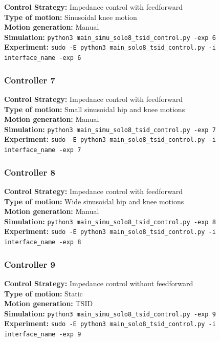 \documentclass[12pt,a4paper]{article}
\begin{document}
\textbf{Control Strategy:} Impedance control with feedforward \\
\textbf{Type of motion:} Sinusoidal knee motion \\
\textbf{Motion generation:} Manual \\
\textbf{Simulation:} \texttt{python3 main\_simu\_solo8\_tsid\_control.py -exp 6} \\
\textbf{Experiment:} \texttt{sudo -E python3 main\_solo8\_tsid\_control.py -i interface\_name -exp 6} \\

\subsubsection{Controller 7}

\textbf{Control Strategy:} Impedance control with feedforward \\
\textbf{Type of motion:} Small sinusoidal hip and knee motions \\
\textbf{Motion generation:} Manual \\
\textbf{Simulation:} \texttt{python3 main\_simu\_solo8\_tsid\_control.py -exp 7} \\
\textbf{Experiment:} \texttt{sudo -E python3 main\_solo8\_tsid\_control.py -i interface\_name -exp 7} \\

\subsubsection{Controller 8}

\textbf{Control Strategy:} Impedance control with feedforward \\
\textbf{Type of motion:} Wide sinusoidal hip and knee motions \\
\textbf{Motion generation:} Manual \\
\textbf{Simulation:} \texttt{python3 main\_simu\_solo8\_tsid\_control.py -exp 8} \\
\textbf{Experiment:} \texttt{sudo -E python3 main\_solo8\_tsid\_control.py -i interface\_name -exp 8} \\

\subsubsection{Controller 9}

\textbf{Control Strategy:} Impedance control without feedforward \\
\textbf{Type of motion:} Static \\
\textbf{Motion generation:} TSID \\
\textbf{Simulation:} \texttt{python3 main\_simu\_solo8\_tsid\_control.py -exp 9} \\
\textbf{Experiment:} \texttt{sudo -E python3 main\_solo8\_tsid\_control.py -i interface\_name -exp 9} \\
\end{document}
